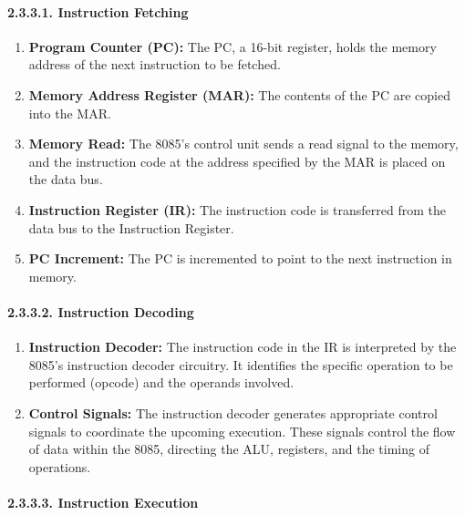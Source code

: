 \documentclass[
]{article}
\begin{document}
\hypertarget{2331-instruction-fetching}{%
\paragraph{2.3.3.1. Instruction
Fetching}\label{2331-instruction-fetching}}

\begin{enumerate}
\def\labelenumi{\arabic{enumi}.}
\item
  \textbf{Program Counter (PC):} The PC, a 16-bit register, holds the
  memory address of the next instruction to be fetched.
\item
  \textbf{Memory Address Register (MAR):} The contents of the PC are
  copied into the MAR.
\item
  \textbf{Memory Read:} The 8085's control unit sends a read signal to
  the memory, and the instruction code at the address specified by the
  MAR is placed on the data bus.
\item
  \textbf{Instruction Register (IR):} The instruction code is
  transferred from the data bus to the Instruction Register.
\item
  \textbf{PC Increment:} The PC is incremented to point to the next
  instruction in memory.
\end{enumerate}

\hypertarget{2332-instruction-decoding}{%
\paragraph{2.3.3.2. Instruction
Decoding}\label{2332-instruction-decoding}}

\begin{enumerate}
\def\labelenumi{\arabic{enumi}.}
\item
  \textbf{Instruction Decoder:} The instruction code in the IR is
  interpreted by the 8085's instruction decoder circuitry. It identifies
  the specific operation to be performed (opcode) and the operands
  involved.
\item
  \textbf{Control Signals:} The instruction decoder generates
  appropriate control signals to coordinate the upcoming execution.
  These signals control the flow of data within the 8085, directing the
  ALU, registers, and the timing of operations.
\end{enumerate}

\hypertarget{2333-instruction-execution}{%
\paragraph{2.3.3.3. Instruction
Execution}\label{2333-instruction-execution}}
\end{document}
